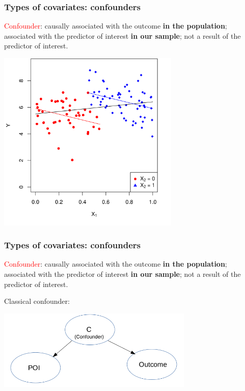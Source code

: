 \documentclass[12pt, 
hyperref={colorlinks=true, linkcolor=blue, urlcolor=cyan},dvipsnames]{beamer}
\begin{document}
\begin{frame}
\frametitle{Types of covariates: confounders}

\textcolor{red}{Confounder}: causally associated with the outcome \textbf{in the population}; associated with the predictor of interest \textbf{in our sample}; not a result of the predictor of interest.

\centering
\vspace{-0.1cm}
\includegraphics[width=0.65\textwidth]{plots/confounding_colored_with_lines.png}

\end{frame}

\begin{frame}
\frametitle{Types of covariates: confounders}
\textcolor{red}{Confounder}: causally associated with the outcome \textbf{in the population}; associated with the predictor of interest \textbf{in our sample}; not a result of the predictor of interest.

Classical confounder:

\begin{center}
\includegraphics[width=0.7\textwidth]{plots/classical_confounder.png}
\end{center}

\end{frame}
\end{document}
